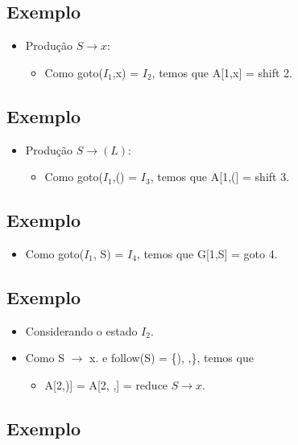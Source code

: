 \documentclass[11pt]{article}
\begin{document}
\subsection*{Exemplo}
\label{sec:orgc463154}

\begin{itemize}
\item Produção \(S \to x\):
\begin{itemize}
\item Como goto(\(I_1\),x) = \(I_2\), temos que A[1,x] = shift 2.
\end{itemize}
\end{itemize}
\subsection*{Exemplo}
\label{sec:orgebe535d}

\begin{itemize}
\item Produção \(S \to (L)\):
\begin{itemize}
\item Como goto(\(I_1\),() = \(I_3\), temos que A[1,(] = shift 3.
\end{itemize}
\end{itemize}
\subsection*{Exemplo}
\label{sec:org4f48c18}

\begin{itemize}
\item Como goto(\(I_1\), S) = \(I_4\), temos que G[1,S] = goto 4.
\end{itemize}
\subsection*{Exemplo}
\label{sec:orga00a250}

\begin{itemize}
\item Considerando o estado \(I_2\).

\item Como S \(\to\) x. e follow(S) = \{), ,\}, temos que
\begin{itemize}
\item A[2,)] = A[2, ,] = reduce \(S \to x\).
\end{itemize}
\end{itemize}
\subsection*{Exemplo}
\label{sec:orgda56097}
\end{document}
